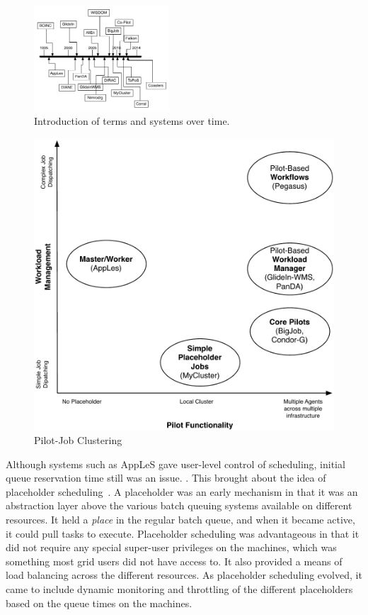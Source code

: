 \documentclass{sig-alternate}
\begin{document}
\begin{figure}[t]
  \centering
    \includegraphics[width=0.45\textwidth]{figures/timeline}
    \caption{Introduction of terms and systems over time.}
    \label{fig:timeline}
\end{figure}

\begin{figure}[t]
	\centering
		\includegraphics[width=.45\textwidth]{figures/pilotjob-clustering.pdf}
	\caption{Pilot-Job Clustering}
	\label{fig:pilotjob_clustering}
\end{figure}


Although systems such as AppLeS gave user-level control of scheduling, initial
queue reservation time still was an issue.
.
This brought about the idea of placeholder
scheduling~\cite{Pinchak02practicalheterogeneous}.  A placeholder was
an early \pilot mechanism in that it was an abstraction layer above
the various batch queuing systems available on different resources.
It held a \textit{place} in the regular batch queue, and when it
became active, it could pull tasks to execute.  Placeholder scheduling
was advantageous in that it did not require any special super-user
privileges on the machines, which was something most grid users did
not have access to.  It also provided a means of load balancing across
the different resources.  As placeholder scheduling evolved, it came
to include dynamic monitoring and throttling of the different
placeholders based on the queue times on the machines.
\end{document}
